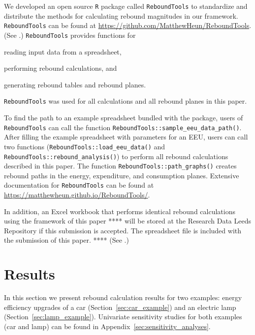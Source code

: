 \documentclass[12pt]{article}\usepackage[]{graphicx}\usepackage[]{xcolor}
\begin{document}
We developed an open source \texttt{R} package called \texttt{ReboundTools}
to standardize and distribute the methods for calculating rebound magnitudes in our framework.
\texttt{ReboundTools} can be found at \url{https://github.com/MatthewHeun/ReboundTools}.
(See \citet{Heun:2023aa}.)
\texttt{ReboundTools} provides functions for
%
\begin{enumerate*}[label={(\roman*)}]

  \item reading input data from a spreadsheet,

  \item performing rebound calculations, and

  \item generating rebound tables and rebound planes.

\end{enumerate*}
%
\texttt{ReboundTools} was used for
all calculations and all rebound planes in this paper.

To find the path to an example spreadsheet bundled with the package,
users of \texttt{ReboundTools}
can call the function \texttt{ReboundTools::sample\_eeu\_data\_path()}.
After filling the example spreadsheet with parameters for an EEU,
users can call two functions
(\texttt{ReboundTools::load\_eeu\_data()} and \texttt{ReboundTools::rebound\_analysis()})
to perform all rebound calculations described in this paper.
The function \texttt{ReboundTools::path\_graphs()} creates
rebound paths in the energy, expenditure, and consumption planes.
Extensive documentation for \texttt{ReboundTools}
can be found at \url{https://matthewheun.github.io/ReboundTools/}.

In addition, an Excel workbook that performs identical rebound calculations
using the framework of this paper
**** will be stored at the
Research Data Leeds Repository if this submission is accepted.
The spreadsheet file is included with the submission of this paper. ****
(See \citet{Brockway:2023aa}.)


\section{Results}
\label{sec:results}

In this section we present rebound calculation results for two examples:
energy efficiency upgrades of a car (Section~\ref{sec:car_example}) and
an electric lamp (Section~\ref{sec:lamp_example}).
Univariate sensitivity studies for both examples (car and lamp)
can be found in Appendix~\ref{sec:sensitivity_analyses}.
\end{document}

